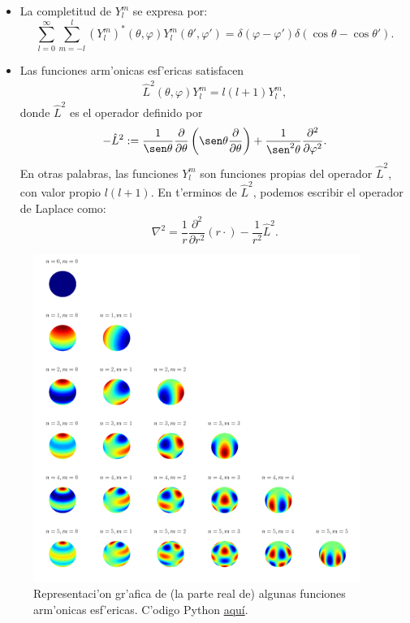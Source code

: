 \begin{itemize}
\item La completitud de $Y_l^m $ se expresa por:
\begin{equation}
    \sum_{l=0}^\infty\sum_{m=-l}^l (Y_l^m)^*(\theta,\varphi)
    Y_l^m (\theta',\varphi') = \delta(\varphi-\varphi')\delta(\cos\theta-
    \cos\theta').
\end{equation}
\item Las  funciones arm'onicas esf'ericas satisfacen
 \begin{eqnarray}
  \hat{L}^2(\theta,\varphi) Y_l^m  = l(l+1)Y_l^m ,
 \end{eqnarray}
donde $\hat{L}^2$ es el operador definido por
 \begin{eqnarray}
  -\hat{L}^2 :=
\frac{1}{\sen\theta}\frac{\partial}{\partial\theta}\left(\sen\theta\frac{
\partial}{\partial
  \theta}\right)+\frac 1{\sen^2\theta}\frac{\partial^2}{\partial \varphi^2}.
 \end{eqnarray}
 En otras palabras, las funciones $Y_l^m $ son funciones propias del operador
$\hat{L}^2$, con valor propio $l(l+1)$. En t'erminos de $\hat{L}^2$, podemos
escribir el operador de Laplace como:
 \begin{equation}
  \nabla^2 = \frac 1r\frac{\partial^2}{\partial r^2}\left( r \cdot\right) -
\frac{1}{r^2}\hat{L}^2.
\end{equation}
 \end{itemize}

\begin{figure}[H]
\centering
\includegraphics[angle=0,width=0.95\textwidth]{figs/fig-Aes3Dcolores.png}
\caption{Representaci'on gr'afica de (la parte real de) algunas funciones arm'onicas esf'ericas. C'odigo Python \href{https://github.com/gfrubi/FM2/blob/master/figuras-editables/Graficos-AE-esfera-colores.py}{aqu\'i}.}
\label{fig-Aes}
\end{figure}

